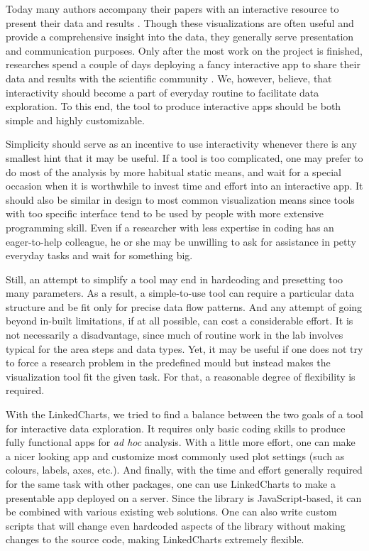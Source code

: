 \documentclass[twocolumn,10pt]{article}
\begin{document}
Today many authors accompany their papers with an interactive resource to present their data and results \citep{travaglini_2020, roider_2020, kalucka_2020}. Though these visualizations are often useful and provide a comprehensive insight into the data, they generally serve presentation and communication purposes. Only after the most work on the project is finished, researches spend a couple of days deploying a fancy interactive app to share their data and results with the scientific community \citep{batch_2017}. We, however, believe, that interactivity should become a part of everyday routine to facilitate data exploration. To this end, the tool to produce interactive apps should be both simple and highly customizable.

Simplicity should serve as an incentive to use interactivity whenever there is any smallest hint that it may be useful. If a tool is too complicated, one may prefer to do most of the analysis by more habitual static means, and wait for a special occasion when it is worthwhile to invest time and effort into an interactive app. It should also be similar in design to most common visualization means since tools with too specific interface tend to be used by people with more extensive programming skill. Even if a researcher with less expertise in coding has an eager-to-help colleague, he or she may be unwilling to ask for assistance in petty everyday tasks and wait for something big.

Still, an attempt to simplify a tool may end in hardcoding and presetting too many parameters. As a result, a simple-to-use tool can require a particular data structure and be fit only for precise data flow patterns. And any attempt of going beyond in-built limitations, if at all possible, can cost a considerable effort. It is not necessarily a disadvantage, since much of routine work in the lab involves typical for the area steps and data types. Yet, it may be useful if one does not try to force a research problem in the predefined mould but instead makes the visualization tool fit the given task. For that, a reasonable degree of flexibility is required.

With the LinkedCharts, we tried to find a balance between the two goals of a tool for interactive data exploration. It requires only basic coding skills to produce fully functional apps for \emph{ad hoc} analysis. With a little more effort, one can make a nicer looking app and customize most commonly used plot settings (such as colours, labels, axes, etc.). And finally, with the time and effort generally required for the same task with other packages, one can use LinkedCharts to make a presentable app deployed on a server. Since the library is JavaScript-based, it can be combined with various existing web solutions. One can also write custom scripts that will change even hardcoded aspects of the library without making changes to the source code, making LinkedCharts extremely flexible. 
\end{document}
